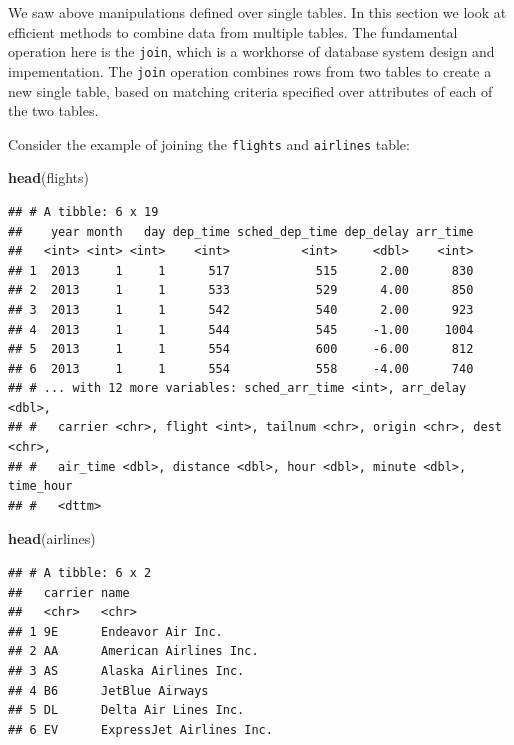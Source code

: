 \documentclass[12pt,]{book}
\newenvironment{Shaded}{\begin{snugshade}}{\end{snugshade}}
\newcommand{\KeywordTok}[1]{\textcolor[rgb]{0.13,0.29,0.53}{\textbf{#1}}}
\newcommand{\NormalTok}[1]{#1}
\theoremstyle{definition}
\theoremstyle{definition}
\theoremstyle{definition}
\theoremstyle{remark}
\begin{document}
We saw above manipulations defined over single tables. In this section
we look at efficient methods to combine data from multiple tables. The
fundamental operation here is the \texttt{join}, which is a workhorse of
database system design and impementation. The \texttt{join} operation
combines rows from two tables to create a new single table, based on
matching criteria specified over attributes of each of the two tables.

Consider the example of joining the \texttt{flights} and
\texttt{airlines} table:

\begin{Shaded}
\begin{Highlighting}[]
\KeywordTok{head}\NormalTok{(flights)}
\end{Highlighting}
\end{Shaded}

\begin{verbatim}
## # A tibble: 6 x 19
##    year month   day dep_time sched_dep_time dep_delay arr_time
##   <int> <int> <int>    <int>          <int>     <dbl>    <int>
## 1  2013     1     1      517            515      2.00      830
## 2  2013     1     1      533            529      4.00      850
## 3  2013     1     1      542            540      2.00      923
## 4  2013     1     1      544            545     -1.00     1004
## 5  2013     1     1      554            600     -6.00      812
## 6  2013     1     1      554            558     -4.00      740
## # ... with 12 more variables: sched_arr_time <int>, arr_delay <dbl>,
## #   carrier <chr>, flight <int>, tailnum <chr>, origin <chr>, dest <chr>,
## #   air_time <dbl>, distance <dbl>, hour <dbl>, minute <dbl>, time_hour
## #   <dttm>
\end{verbatim}

\begin{Shaded}
\begin{Highlighting}[]
\KeywordTok{head}\NormalTok{(airlines)}
\end{Highlighting}
\end{Shaded}

\begin{verbatim}
## # A tibble: 6 x 2
##   carrier name                    
##   <chr>   <chr>                   
## 1 9E      Endeavor Air Inc.       
## 2 AA      American Airlines Inc.  
## 3 AS      Alaska Airlines Inc.    
## 4 B6      JetBlue Airways         
## 5 DL      Delta Air Lines Inc.    
## 6 EV      ExpressJet Airlines Inc.
\end{verbatim}
\end{document}
